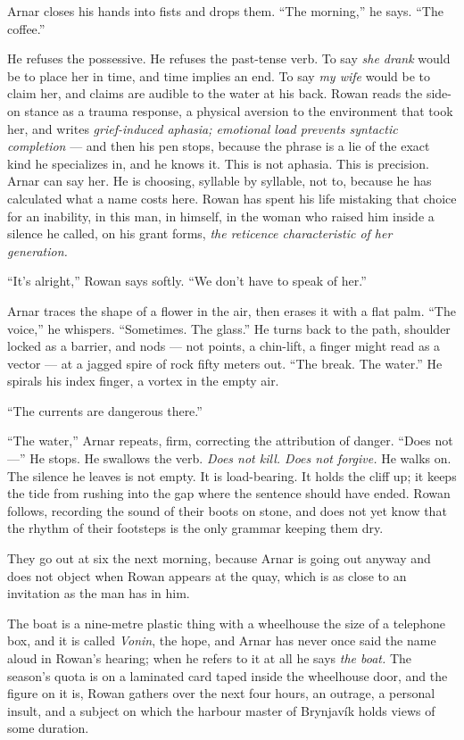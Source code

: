 \documentclass[11pt,oneside]{book}
\newcommand{\sceneline}{%
  \par\vspace{1.2em}
  \begin{center}
    \fontsize{11}{11}\selectfont \textbullet\quad\textbullet\quad\textbullet
  \end{center}
  \vspace{0.6em}\noindent\ignorespaces
}
\begin{document}
Arnar closes his hands into fists and drops them. ``The morning,'' he
says. ``The coffee.''

He refuses the possessive. He refuses the past-tense verb. To say
\emph{she drank} would be to place her in time, and time implies an end.
To say \emph{my wife} would be to claim her, and claims are audible to
the water at his back. Rowan reads the side-on stance as a trauma
response, a physical aversion to the environment that took her, and
writes \emph{grief-induced aphasia; emotional load prevents syntactic
completion} --- and then his pen stops, because the phrase is a lie of
the exact kind he specializes in, and he knows it. This is not aphasia.
This is precision. Arnar can say her. He is choosing, syllable by
syllable, not to, because he has calculated what a name costs here.
Rowan has spent his life mistaking that choice for an inability, in this
man, in himself, in the woman who raised him inside a silence he called,
on his grant forms, \emph{the reticence characteristic of her
generation.}

``It's alright,'' Rowan says softly. ``We don't have to speak of her.''

Arnar traces the shape of a flower in the air, then erases it with a
flat palm. ``The voice,'' he whispers. ``Sometimes. The glass.'' He
turns back to the path, shoulder locked as a barrier, and nods --- not
points, a chin-lift, a finger might read as a vector --- at a jagged
spire of rock fifty meters out. ``The break. The water.'' He spirals his
index finger, a vortex in the empty air.

``The currents are dangerous there.''

``The water,'' Arnar repeats, firm, correcting the attribution of
danger. ``Does not---'' He stops. He swallows the verb. \emph{Does not
kill. Does not forgive.} He walks on. The silence he leaves is not
empty. It is load-bearing. It holds the cliff up; it keeps the tide from
rushing into the gap where the sentence should have ended. Rowan
follows, recording the sound of their boots on stone, and does not yet
know that the rhythm of their footsteps is the only grammar keeping them
dry.

\sceneline

They go out at six the next morning, because Arnar is going out anyway
and does not object when Rowan appears at the quay, which is as close to
an invitation as the man has in him.

The boat is a nine-metre plastic thing with a wheelhouse the size of a
telephone box, and it is called \emph{Vonin}, the hope, and Arnar has
never once said the name aloud in Rowan's hearing; when he refers to it
at all he says \emph{the boat.} The season's quota is on a laminated
card taped inside the wheelhouse door, and the figure on it is, Rowan
gathers over the next four hours, an outrage, a personal insult, and a
subject on which the harbour master of Brynjavík holds views of some
duration.
\end{document}
